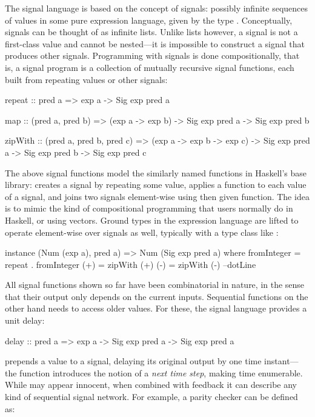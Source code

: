\documentclass[../paper.tex]{subfiles}
\begin{document}
The signal language is based on the concept of signals: possibly infinite sequences of values in some pure expression language, given by the type . Conceptually, signals can be thought of as infinite lists. Unlike lists however, a signal is not a first-class value and cannot be nested---it is impossible to construct a signal that produces other signals. Programming with signals is done compositionally, that is, a signal program is a collection of mutually recursive signal functions, each built from repeating values or other signals:

\begin{code}
repeat :: pred a => exp a -> Sig exp pred a

map :: (pred a, pred b) => (exp a -> exp b) ->
  Sig exp pred a -> Sig exp pred b

zipWith :: (pred a, pred b, pred c) => (exp a -> exp b -> exp c) ->
  Sig exp pred a -> Sig exp pred b -> Sig exp pred c
\end{code}

The above signal functions model the similarly named functions in Haskell's base library:  creates a signal by repeating some value,  applies a function to each value of a signal, and  joins two signals element-wise using then given function. The idea is to mimic the kind of compositional programming that users normally do in Haskell, or using vectors. Ground types in the expression language are lifted to operate element-wise over signals as well, typically with a type class like :

\begin{code}
instance (Num (exp a), pred a) => Num (Sig exp pred a) where
  fromInteger = repeat . fromInteger
  (+)         = zipWith (+)
  (-)         = zipWith (-)
  --dotLine
\end{code}

All signal functions shown so far have been combinatorial in nature, in the sense that their output only depends on the current inputs. Sequential functions on the other hand needs to access older values. For these, the signal language provides a unit delay:

\begin{code}
delay :: pred a => exp a -> Sig exp pred a -> Sig exp pred a
\end{code}

\noindent {} prepends a value to a signal, delaying its original output by one time instant---the function introduces the notion of a \emph{next time step}, making time enumerable. While  may appear innocent, when combined with feedback it can describe any kind of sequential signal network. For example, a parity checker can be defined as:
\end{document}
